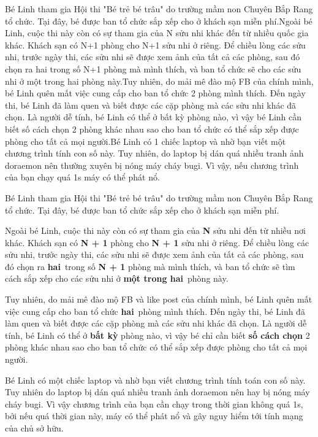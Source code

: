 Bé Linh tham gia Hội thi "Bé trẻ bé trâu" do trường mầm non Chuyên Bắp Rang tổ chức. Tại đây, bé được ban tổ chức sắp xếp cho ở khách sạn miễn phí.Ngoài bé Linh, cuộc thi này còn có sự tham gia của N sửu nhi khác đến từ nhiều quốc gia khác. Khách sạn có N+1 phòng cho N+1 sửu nhi ở riêng. Để chiều lòng các sửu nhi, trước ngày thi, các sửu nhi sẽ được xem ảnh của tất cả các phòng, sau đó chọn ra hai trong số N+1 phòng mà mình thích, và ban tổ chức sẽ cho các sửu nhi ở một trong hai phòng này.Tuy nhiên, do mải mê đào mộ FB của chính mình, bé Linh quên mất việc cung cấp cho ban tổ chức 2 phòng mình thích. Đến ngày thi, bé Linh đã làm quen và biết được các cặp phòng mà các sửu nhi khác đã chọn. Là người dễ tính, bé Linh có thể ở bất kỳ phòng nào, vì vậy bé Linh cần biết số cách chọn 2 phòng khác nhau sao cho ban tổ chức có thể sắp xếp được phòng cho tất cả mọi người.Bé Linh có 1 chiếc laptop và nhờ bạn viết một chương trình tính con số này. Tuy nhiên, do laptop bị dán quá nhiều tranh ảnh doraemon nên thường xuyên bị nóng máy cháy bugi. Vì vậy, nếu chương trình của bạn chạy quá 1s máy có thể phát nổ.

Bé Linh tham gia Hội thi "Bé trẻ bé trâu" do trường mầm non Chuyên Bắp Rang tổ chức. Tại đây, bé được ban tổ chức sắp xếp cho ở khách sạn miễn phí.

Ngoài bé Linh, cuộc thi này còn có sự tham gia của \textbf{N} sửu nhi đến từ nhiều nơi khác. Khách sạn có \textbf{N + 1} phòng cho \textbf{N + 1} sửu nhi ở riêng. Để chiều lòng các sửu nhi, trước ngày thi, các sửu nhi sẽ được xem ảnh của tất cả các phòng, sau đó chọn ra \textbf{hai} trong số \textbf{N + 1} phòng mà mình thích, và ban tổ chức sẽ tìm cách sắp xếp cho các sửu nhi ở \textbf{một trong hai} phòng này.

Tuy nhiên, do mải mê đào mộ FB và like post của chính mình, bé Linh quên mất việc cung cấp cho ban tổ chức \textbf{hai} phòng mình thích. Đến ngày thi, bé Linh đã làm quen và biết được các cặp phòng mà các sửu nhi khác đã chọn. Là người dễ tính, bé Linh có thể ở \textbf{bất kỳ} phòng nào, vì vậy bé chỉ cần biết \textbf{số cách chọn} 2 phòng khác nhau sao cho ban tổ chức có thể sắp xếp được phòng cho tất cả mọi người.

Bé Linh có một chiếc laptop và nhờ bạn viết chương trình tính toán con số này. Tuy nhiên do laptop bị dán quá nhiều tranh ảnh doraemon nên hay bị nóng máy cháy bugi. Vì vậy chương trình của bạn cần chạy trong thời gian không quá 1s, bởi nếu quá thời gian này, máy có thể phát nổ và gây nguy hiểm tới tính mạng của chủ sở hữu.